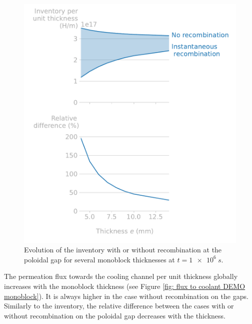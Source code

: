\begin{figure} [h]
    \centering
    \includegraphics[width=\linewidth]{Figures/Chapter3/monoblocks/3D_monoblocks/inventory_vs_thickness.pdf}
    \caption{Evolution of the inventory with or without recombination at the poloidal gap for several monoblock thicknesses at $t=\SI{1e6}{s}$.}
    \label{fig: ratio 3D thickness monoblock}
\end{figure}

The permeation flux towards the cooling channel per unit thickness globally increases with the monoblock thickness (see Figure \ref{fig: flux to coolant DEMO monoblock}).
It is always higher in the case without recombination on the gaps.
Similarly to the inventory, the relative difference between the cases with or without recombination on the poloidal gap decreases with the thickness.

